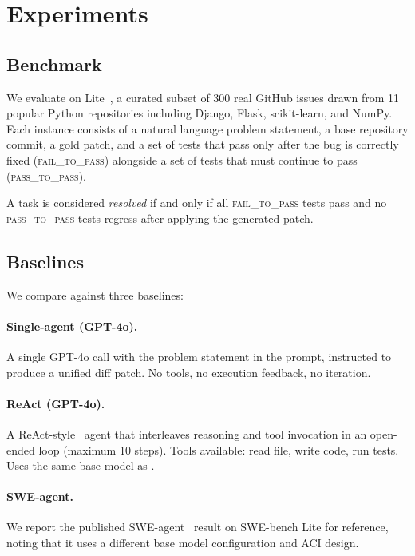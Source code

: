 
\section{Experiments}
\label{sec:experiments}

\subsection{Benchmark}

We evaluate on \swebench{} Lite~\cite{jimenez2024swebench},
a curated subset of 300 real GitHub issues drawn from
11 popular Python repositories including Django, Flask,
scikit-learn, and NumPy. Each instance consists of a
natural language problem statement, a base repository
commit, a gold patch, and a set of tests that pass only
after the bug is correctly fixed (\textsc{fail\_to\_pass})
alongside a set of tests that must continue to pass
(\textsc{pass\_to\_pass}).

A task is considered \textit{resolved} if and only if
all \textsc{fail\_to\_pass} tests pass and no
\textsc{pass\_to\_pass} tests regress after applying
the generated patch.

\subsection{Baselines}

We compare against three baselines:

\paragraph{Single-agent (GPT-4o).}
A single GPT-4o call with the problem statement in the
prompt, instructed to produce a unified diff patch.
No tools, no execution feedback, no iteration.

\paragraph{ReAct (GPT-4o).}
A ReAct-style~\cite{yao2023react} agent that interleaves
reasoning and tool invocation in an open-ended loop
(maximum 10 steps). Tools available: read file, write code,
run tests. Uses the same base model as \agentforge{}.

\paragraph{SWE-agent.}
We report the published SWE-agent~\cite{yang2024sweagent}
result on SWE-bench Lite for reference, noting that it
uses a different base model configuration and ACI design.

